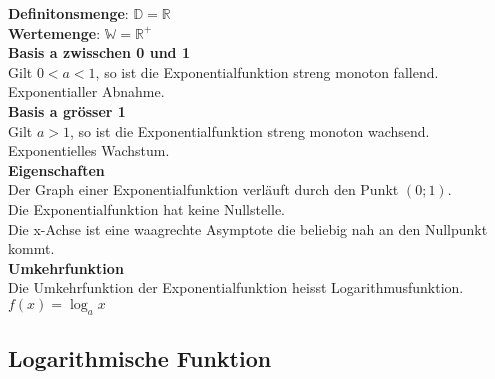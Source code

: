 \begin{multicols}{3}
\begin{center}
    \end{center}
    \textbf{Definitonsmenge}: $\mathbb{D} = \mathbb{R}$\\
    \textbf{Wertemenge}: $\mathbb{W} = \mathbb{R^+}$\\
    \textbf{Basis a zwisschen 0 und 1}\\
    Gilt $0 < a < 1$, so ist die Exponentialfunktion streng monoton fallend. Exponentialler Abnahme.\\
    \textbf{Basis a grösser 1}\\
    Gilt $a > 1$, so ist die Exponentialfunktion streng monoton wachsend. Exponentielles Wachstum.\\
    \textbf{Eigenschaften}\\
    Der Graph einer Exponentialfunktion verläuft durch den Punkt $(0;1)$.\\
    Die Exponentialfunktion hat keine Nullstelle.\\
    Die x-Achse ist eine waagrechte Asymptote die beliebig nah an den Nullpunkt kommt.\\
    \textbf{Umkehrfunktion}\\
    Die Umkehrfunktion der Exponentialfunktion heisst Logarithmusfunktion. $f(x) = \log_{a}x$\\ 
        
    \subsection*{Logarithmische Funktion}
    \begin{center}
\end{center}
\end{multicols}
